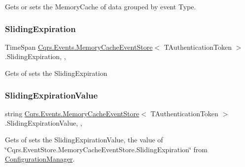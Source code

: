 Gets or sets the Memory\+Cache of data grouped by event Type. 

\mbox{\label{classCqrs_1_1Events_1_1MemoryCacheEventStore_a93423872cdd702ee6257c0cc704c0c06_a93423872cdd702ee6257c0cc704c0c06}} 
\subsubsection{\texorpdfstring{Sliding\+Expiration}{SlidingExpiration}}
{\footnotesize\ttfamily Time\+Span \hyperlink{classCqrs_1_1Events_1_1MemoryCacheEventStore}{Cqrs.\+Events.\+Memory\+Cache\+Event\+Store}$<$ T\+Authentication\+Token $>$.Sliding\+Expiration\hspace{0.3cm}{\ttfamily [get]}, {\ttfamily [set]}, {\ttfamily [protected]}}



Gets of sets the Sliding\+Expiration 

\mbox{\label{classCqrs_1_1Events_1_1MemoryCacheEventStore_af45012b233f4f4c8ef3c00bf8fba7a80_af45012b233f4f4c8ef3c00bf8fba7a80}} 
\subsubsection{\texorpdfstring{Sliding\+Expiration\+Value}{SlidingExpirationValue}}
{\footnotesize\ttfamily string \hyperlink{classCqrs_1_1Events_1_1MemoryCacheEventStore}{Cqrs.\+Events.\+Memory\+Cache\+Event\+Store}$<$ T\+Authentication\+Token $>$.Sliding\+Expiration\+Value\hspace{0.3cm}{\ttfamily [get]}, {\ttfamily [set]}, {\ttfamily [protected]}}



Gets of sets the Sliding\+Expiration\+Value, the value of \char`\"{}\+Cqrs.\+Event\+Store.\+Memory\+Cache\+Event\+Store.\+Sliding\+Expiration\char`\"{} from \hyperlink{classCqrs_1_1Events_1_1MemoryCacheEventStore_a8a4fc4fa5d767e4d15344daf1ba7ea01_a8a4fc4fa5d767e4d15344daf1ba7ea01}{Configuration\+Manager}. 

